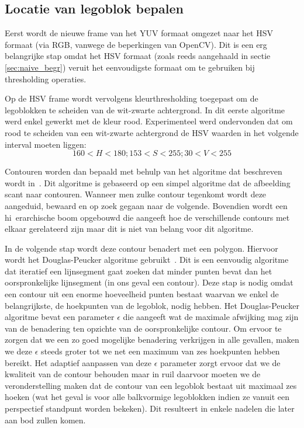 \subsection{Locatie van legoblok bepalen} \label{sec:naive_algo_1}
Eerst wordt de nieuwe frame van het YUV formaat omgezet naar het HSV formaat (via RGB, vanwege de beperkingen van OpenCV). Dit is een erg belangrijke stap omdat het HSV formaat (zoals reeds aangehaald in sectie \ref{sec:naive_begr}) veruit het eenvoudigste formaat om te gebruiken bij thresholding operaties.

Op de HSV frame wordt vervolgens kleurthresholding toegepast om de legoblokken te scheiden van de wit-zwarte achtergrond. In dit eerste algoritme werd enkel gewerkt met de kleur rood. Experimenteel werd ondervonden dat om rood te scheiden van een wit-zwarte achtergrond de HSV waarden in het volgende interval moeten liggen:
$$ 160 < H < 180; 153 < S < 255; 30 < V < 255$$

Contouren worden dan bepaald met behulp van het algoritme dat beschreven wordt in~\cite{suzuki1985topological}. Dit algoritme is gebaseerd op een simpel algoritme dat de afbeelding scant naar contouren. Wanneer men zulke contour tegenkomt wordt deze aangeduid, bewaard en op zoek gegaan naar de volgende. Bovendien wordt een hi\ erarchische boom opgebouwd die aangeeft hoe de verschillende contours met elkaar gerelateerd zijn maar dit is niet van belang voor dit algoritme.

In de volgende stap wordt deze contour benadert met een polygon. Hiervoor wordt het Douglas-Peucker algoritme gebruikt~\cite{douglas1973algorithms}. Dit is een eenvoudig algoritme dat iteratief een lijnsegment gaat zoeken dat minder punten bevat dan het oorspronkelijke lijnsegment (in ons geval een contour). Deze stap is nodig omdat een contour uit een enorme hoeveelheid punten bestaat waarvan we enkel de belangrijkste, de hoekpunten van de legoblok, nodig hebben. Het Douglas-Peucker algoritme bevat een parameter $\epsilon$ die aangeeft wat de maximale afwijking mag zijn van de benadering ten opzichte van de oorspronkelijke contour. Om ervoor te zorgen dat we een zo goed mogelijke benadering verkrijgen in alle gevallen, maken we deze $\epsilon$ steeds groter tot we net een maximum van zes hoekpunten hebben bereikt. Het adaptief aanpassen van deze $\epsilon$ parameter zorgt ervoor dat we de kwaliteit van de contour behouden maar in ruil daarvoor moeten we de veronderstelling maken dat de contour van een legoblok bestaat uit maximaal zes hoeken (wat het geval is voor alle balkvormige legoblokken indien ze vanuit een perspectief standpunt worden bekeken). Dit resulteert in enkele nadelen die later aan bod zullen komen.

